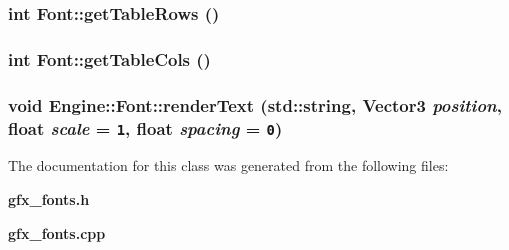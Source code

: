 \subsubsection{\setlength{\rightskip}{0pt plus 5cm}int Font::getTableRows ()}\label{classEngine_1_1Font_0e48e1275cc980edf0fa37c9c1f7aa8c}


\subsubsection{\setlength{\rightskip}{0pt plus 5cm}int Font::getTableCols ()}\label{classEngine_1_1Font_5bf9a310d726137c5b10880c8cd6ff42}


\subsubsection{\setlength{\rightskip}{0pt plus 5cm}void Engine::Font::renderText (std::string, {\bf Vector3} {\em position}, float {\em scale} = {\tt 1}, float {\em spacing} = {\tt 0})}\label{classEngine_1_1Font_27579866c961a9436ed5fff45072e90f}




The documentation for this class was generated from the following files:\begin{CompactItemize}
\item 
{\bf gfx\_\-fonts.h}\item 
{\bf gfx\_\-fonts.cpp}\end{CompactItemize}
